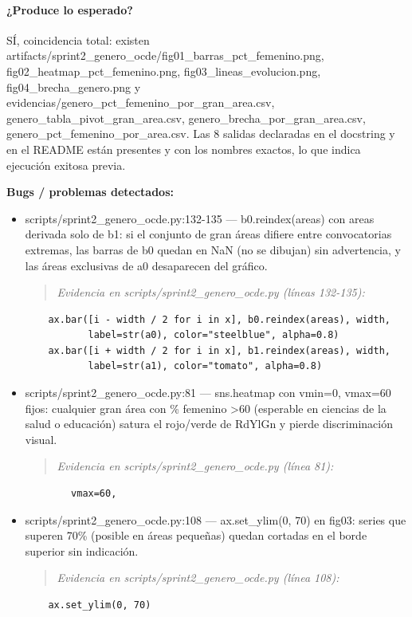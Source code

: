 \paragraph{¿Produce lo esperado?}
SÍ, coincidencia total: existen artifacts/sprint2\_genero\_ocde/fig01\_barras\_pct\_femenino.png, fig02\_heatmap\_pct\_femenino.png, fig03\_lineas\_evolucion.png, fig04\_brecha\_genero.png y evidencias/genero\_pct\_femenino\_por\_gran\_area.csv, genero\_tabla\_pivot\_gran\_area.csv, genero\_brecha\_por\_gran\_area.csv, genero\_pct\_femenino\_por\_area.csv. Las 8 salidas declaradas en el docstring y en el README están presentes y con los nombres exactos, lo que indica ejecución exitosa previa.

\begin{tcolorbox}[riesgo]
\textbf{Bugs / problemas detectados:}
\begin{itemize}
  \item scripts/sprint2\_genero\_ocde.py:132-135 --- b0.reindex(areas) con areas derivada solo de b1: si el conjunto de gran áreas difiere entre convocatorias extremas, las barras de b0 quedan en NaN (no se dibujan) sin advertencia, y las áreas exclusivas de a0 desaparecen del gráfico.
\begin{quote}\footnotesize\ttfamily
\noindent\emph{Evidencia en scripts/sprint2\_genero\_ocde.py (líneas 132-135):}
\end{quote}
\begin{lstlisting}
    ax.bar([i - width / 2 for i in x], b0.reindex(areas), width,
           label=str(a0), color="steelblue", alpha=0.8)
    ax.bar([i + width / 2 for i in x], b1.reindex(areas), width,
           label=str(a1), color="tomato", alpha=0.8)
\end{lstlisting}

  \item scripts/sprint2\_genero\_ocde.py:81 --- sns.heatmap con vmin=0, vmax=60 fijos: cualquier gran área con \% femenino >60 (esperable en ciencias de la salud o educación) satura el rojo/verde de RdYlGn y pierde discriminación visual.
\begin{quote}\footnotesize\ttfamily
\noindent\emph{Evidencia en scripts/sprint2\_genero\_ocde.py (línea 81):}
\end{quote}
\begin{lstlisting}
        vmax=60,
\end{lstlisting}

  \item scripts/sprint2\_genero\_ocde.py:108 --- ax.set\_ylim(0, 70) en fig03: series que superen 70\% (posible en áreas pequeñas) quedan cortadas en el borde superior sin indicación.
\begin{quote}\footnotesize\ttfamily
\noindent\emph{Evidencia en scripts/sprint2\_genero\_ocde.py (línea 108):}
\end{quote}
\begin{lstlisting}
    ax.set_ylim(0, 70)
\end{lstlisting}

\end{itemize}
\end{tcolorbox}

